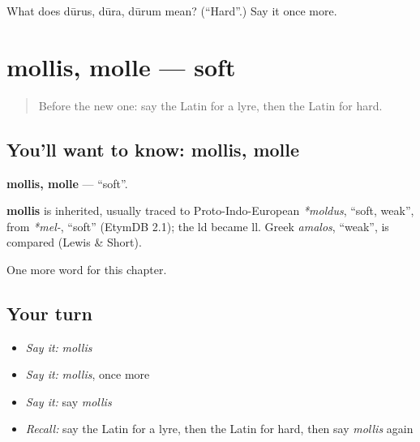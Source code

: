 \begin{tcolorbox}[breakable,colback=teal!4,colframe=teal!35!black,title={Before you move on}]
What does dūrus, dūra, dūrum mean? (\textquotedblleft{}Hard\textquotedblright{}.) Say it once more.
\end{tcolorbox}
\section[mollis, molle]{mollis, molle — soft}

\label{lesson:LA-C143-mollis}



\begin{quote}
Before the new one: say the Latin for a lyre, then the Latin for hard.
\end{quote}

\subsection*{You'll want to know: mollis, molle}
\textbf{mollis, molle} — \textquotedblleft{}soft\textquotedblright{}.

\begin{cousinweb}
\textbf{mollis} is inherited, usually traced to Proto-Indo-European \emph{*moldus}, \textquotedblleft{}soft, weak\textquotedblright{}, from \emph{*mel-}, \textquotedblleft{}soft\textquotedblright{} (EtymDB 2.1); the ld became ll. Greek \emph{amalos}, \textquotedblleft{}weak\textquotedblright{}, is compared (Lewis \& Short).
\end{cousinweb}

\begin{grammarlens}[title={What you've built}]
One more word for this chapter.
\end{grammarlens}

\subsection*{Your turn}
\begin{itemize}
\raggedright
  \item \emph{Say it:} \emph{mollis}
  \item \emph{Say it:} \emph{mollis}, once more
  \item \emph{Say it:} say \emph{mollis}
  \item \emph{Recall:} say the Latin for a lyre, then the Latin for hard, then say \emph{mollis} again
\end{itemize}

